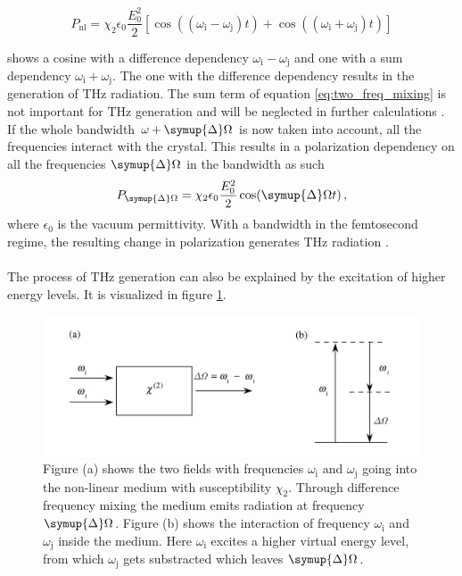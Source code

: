 \begin{equation}
    P_\text{nl} = \chi_2 \epsilon_0 \frac{E_0^2}{2}\left[\cos((\omega_\text{i} - \omega_\text{j})t) + \cos((\omega_\text{i} + \omega_\text{j})t)\right]
\label{eq:two_freq_mixing}
\end{equation}

shows a cosine with a difference dependency $\omega_\text{i}-\omega_\text{j}$ and one with a sum dependency $\omega_\text{i}+\omega_\text{j}$.
The one with the difference dependency results in the generation of $\si{\tera\hertz}$ radiation. %
The sum term of equation \eqref{eq:two_freq_mixing} is not important for $\si{\tera\hertz}$ generation and will be neglected in further calculations \cite{wiki_book}.
If the whole bandwidth $\omega + \symup{\Delta}\Omega$ is now taken into account, all the frequencies interact with the crystal.
This results in a polarization dependency on all the frequencies $\symup{\Delta}\Omega$ in the bandwidth as such
\begin{equation}
    P_{\symup{\Delta}\Omega} = \chi_2 \epsilon_0 \frac{E_0^2}{2}\cos(\symup{\Delta}\Omega t) \, ,
    \label{eq:polarization_depens}
\end{equation}
where $\epsilon_0$ is the vacuum permittivity.
With a bandwidth in the femtosecond regime, the resulting change in polarization generates $\si{\tera\hertz}$ radiation \cite{book_optical_rectification,wiki_book}.
\\\\
The process of $\si{\tera\hertz}$ generation can also be explained by the excitation of higher energy levels.
It is visualized in figure \ref{fig:freq_mix}.\FloatBarrier
\begin{figure}
    \centering
    \includegraphics[width=\textwidth]{refferenced_pic/diffrence_frequency_mixing.PNG}
    \caption{Figure (a) shows the two fields with frequencies $\omega_\text{i} $ and $\omega_\text{j}$ going into the non-linear medium with susceptibility $\chi_2$.
    Through difference frequency mixing the medium emits radiation at frequency $\symup{\Delta}\Omega$.
    Figure (b) shows the interaction of frequency $\omega_\text{i} $ and $\omega_\text{j}$ inside the medium.
    Here $\omega_\text{i}$ excites a higher virtual energy level, from which $\omega_\text{j}$ gets substracted which leaves $\symup{\Delta}\Omega$.}
    \label{fig:freq_mix}
\end{figure}\FloatBarrier
